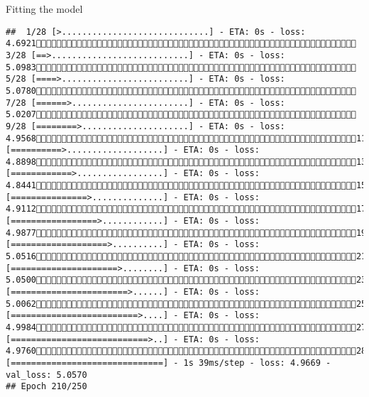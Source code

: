 \documentclass[
  ignorenonframetext,
]{beamer}
\begin{document}
\begin{frame}[fragile]{Fitting the model}
\begin{verbatim}
##  1/28 [>.............................] - ETA: 0s - loss: 4.6921 3/28 [==>...........................] - ETA: 0s - loss: 5.0983 5/28 [====>.........................] - ETA: 0s - loss: 5.0780 7/28 [======>.......................] - ETA: 0s - loss: 5.0207 9/28 [========>.....................] - ETA: 0s - loss: 4.956811/28 [==========>...................] - ETA: 0s - loss: 4.889813/28 [============>.................] - ETA: 0s - loss: 4.844115/28 [===============>..............] - ETA: 0s - loss: 4.911217/28 [=================>............] - ETA: 0s - loss: 4.987719/28 [===================>..........] - ETA: 0s - loss: 5.051621/28 [=====================>........] - ETA: 0s - loss: 5.050023/28 [=======================>......] - ETA: 0s - loss: 5.006225/28 [=========================>....] - ETA: 0s - loss: 4.998427/28 [===========================>..] - ETA: 0s - loss: 4.976028/28 [==============================] - 1s 39ms/step - loss: 4.9669 - val_loss: 5.0570
## Epoch 210/250

\end{verbatim}
\end{frame}
\end{document}
